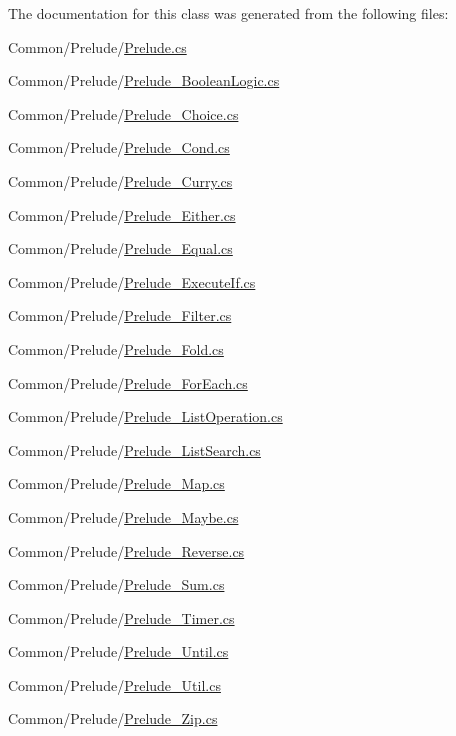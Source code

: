 The documentation for this class was generated from the following files\+:\begin{DoxyCompactItemize}
\item 
Common/\+Prelude/\hyperlink{_prelude_8cs}{Prelude.\+cs}\item 
Common/\+Prelude/\hyperlink{_prelude___boolean_logic_8cs}{Prelude\+\_\+\+Boolean\+Logic.\+cs}\item 
Common/\+Prelude/\hyperlink{_prelude___choice_8cs}{Prelude\+\_\+\+Choice.\+cs}\item 
Common/\+Prelude/\hyperlink{_prelude___cond_8cs}{Prelude\+\_\+\+Cond.\+cs}\item 
Common/\+Prelude/\hyperlink{_prelude___curry_8cs}{Prelude\+\_\+\+Curry.\+cs}\item 
Common/\+Prelude/\hyperlink{_prelude___either_8cs}{Prelude\+\_\+\+Either.\+cs}\item 
Common/\+Prelude/\hyperlink{_prelude___equal_8cs}{Prelude\+\_\+\+Equal.\+cs}\item 
Common/\+Prelude/\hyperlink{_prelude___execute_if_8cs}{Prelude\+\_\+\+Execute\+If.\+cs}\item 
Common/\+Prelude/\hyperlink{_prelude___filter_8cs}{Prelude\+\_\+\+Filter.\+cs}\item 
Common/\+Prelude/\hyperlink{_prelude___fold_8cs}{Prelude\+\_\+\+Fold.\+cs}\item 
Common/\+Prelude/\hyperlink{_prelude___for_each_8cs}{Prelude\+\_\+\+For\+Each.\+cs}\item 
Common/\+Prelude/\hyperlink{_prelude___list_operation_8cs}{Prelude\+\_\+\+List\+Operation.\+cs}\item 
Common/\+Prelude/\hyperlink{_prelude___list_search_8cs}{Prelude\+\_\+\+List\+Search.\+cs}\item 
Common/\+Prelude/\hyperlink{_prelude___map_8cs}{Prelude\+\_\+\+Map.\+cs}\item 
Common/\+Prelude/\hyperlink{_prelude___maybe_8cs}{Prelude\+\_\+\+Maybe.\+cs}\item 
Common/\+Prelude/\hyperlink{_prelude___reverse_8cs}{Prelude\+\_\+\+Reverse.\+cs}\item 
Common/\+Prelude/\hyperlink{_prelude___sum_8cs}{Prelude\+\_\+\+Sum.\+cs}\item 
Common/\+Prelude/\hyperlink{_prelude___timer_8cs}{Prelude\+\_\+\+Timer.\+cs}\item 
Common/\+Prelude/\hyperlink{_prelude___until_8cs}{Prelude\+\_\+\+Until.\+cs}\item 
Common/\+Prelude/\hyperlink{_prelude___util_8cs}{Prelude\+\_\+\+Util.\+cs}\item 
Common/\+Prelude/\hyperlink{_prelude___zip_8cs}{Prelude\+\_\+\+Zip.\+cs}\end{DoxyCompactItemize}
